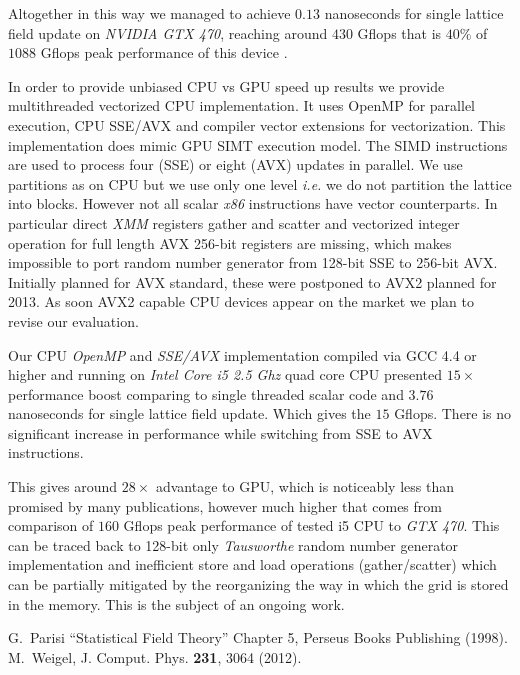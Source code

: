 \documentclass[a4paper]{llncs}
\begin{document}
Altogether in this
way we managed to achieve $0.13$ nanoseconds for single lattice field
update on \emph{NVIDIA GTX 470}, reaching around $430$ Gflops that is
$40\%$ of $1088$ Gflops peak performance of this device .


In order to provide unbiased CPU vs GPU speed up results we provide
multithreaded vectorized CPU implementation. It uses OpenMP for
parallel execution, CPU SSE/AVX and compiler vector extensions for
vectorization.  This implementation does mimic GPU SIMT execution
model.  The SIMD instructions are used to process four (SSE) or eight
(AVX) updates in parallel. We use partitions as on CPU but we use only
one level {\em i.e.} we do not partition the lattice into blocks.
However not all scalar \emph{x86} instructions have vector
counterparts.  In particular direct \emph{XMM} registers gather and
scatter and vectorized integer operation for full length AVX 256-bit
registers are missing, which makes impossible to port random number
generator from 128-bit SSE to 256-bit AVX. Initially planned for AVX
standard, these were postponed to AVX2 planned for 2013. As soon AVX2
capable CPU devices appear on the market we plan to revise our
evaluation.


Our CPU \emph{OpenMP} and \emph{SSE/AVX} implementation compiled via
GCC 4.4 or higher and running on \emph{Intel Core i5 2.5 Ghz} quad
core CPU presented $15\times$ performance boost comparing to single
threaded scalar code and $3.76$ nanoseconds for single lattice field
update.  Which gives the $15$ Gflops. There is no significant increase
in performance while switching from SSE to AVX instructions.

This gives around $28\times$ advantage to GPU, which is noticeably
less than promised by many publications, however much higher that
comes from comparison of $160$ Gflops peak performance of tested i5
CPU to \emph{GTX 470}\cite{Lee:2010:DGV:1816038.1816021}. This can be
traced back to 128-bit only \emph{Tausworthe} random number generator
implementation and inefficient store and load operations
(gather/scatter) which can be partially mitigated by the reorganizing
the way in which the grid is stored in the memory. This is the subject
of an ongoing work.

\begin{thebibliography}{9}
 G.~Parisi ``Statistical Field Theory'' Chapter 5, Perseus Books Publishing (1998).
 M.~Weigel, J. Comput. Phys. \textbf{231}, 3064 (2012).
\end{thebibliography}
\end{document}
